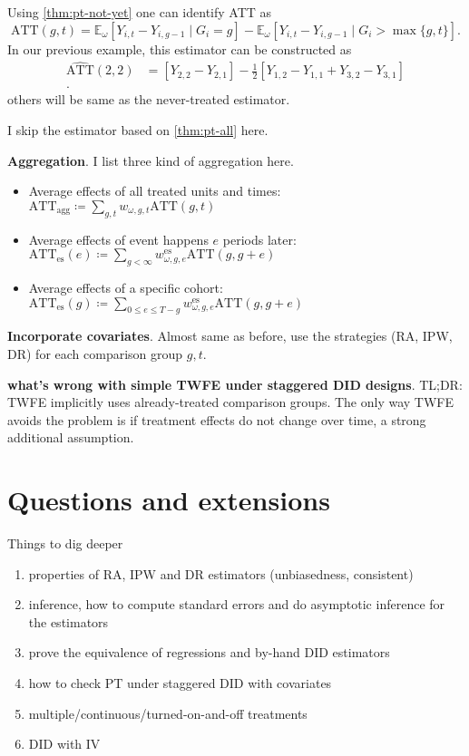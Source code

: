 \documentclass[12pt]{article}
\begin{document}
Using \autoref{thm:pt-not-yet} one can identify ATT as
\[
  \text{ATT}(g,t) = \mathbb{E}_{\omega}[Y_{i,t}-Y_{i,g-1} \mid G_i=g] -
  \mathbb{E}_{\omega}[Y_{i,t}-Y_{i,g-1} \mid G_i > \max \{g,t\} ]
.\]
In our previous example, this estimator can be constructed as
\begin{align*}
  \widehat{\text{ATT}}(2,2) &= [Y_{2,2}-Y_{2,1}] - \frac{1}{2} [Y_{1,2}-Y_{1,1} +
  Y_{3,2}-Y_{3,1}] \\
  .
\end{align*}
others will be same as the never-treated estimator.

I skip the estimator based on \autoref{thm:pt-all} here.


\textbf{Aggregation}. I list three kind of aggregation here.
\begin{itemize}
  \item Average effects of all treated units and times: \( \text{ATT}_{\text{agg}}
    \coloneqq \sum_{g,t} w_{\omega, g,t} \text{ATT}(g,t) \)
  \item Average effects of event happens \( e \) periods later: \(
      \text{ATT}_{\text{es}}(e) \coloneqq \sum_{g < \infty} w^{\text{es}}_{\omega, g, e}
    \text{ATT}(g,g+e)  \)
  \item Average effects of a specific cohort: \( \text{ATT}_{\text{es}}(g) \coloneqq
    \sum_{0 \le e \le T-g} w^{\text{es}}_{\omega, g, e} \text{ATT}(g,g+e)  \)
\end{itemize}

\textbf{Incorporate covariates}. Almost same as before, use the strategies (RA, IPW, DR)
for each comparison group \( g,t \).

\textbf{what's wrong with simple TWFE under staggered DID designs}. TL;DR: TWFE
implicitly uses already-treated comparison groups. The only
way TWFE avoids the problem is if treatment effects do not change over time, a strong additional
assumption.

\section{Questions and extensions}

Things to dig deeper

\begin{enumerate}
  \item properties of RA, IPW and DR estimators (unbiasedness, consistent)
  \item inference, how to compute standard errors and do asymptotic inference for the estimators
  \item prove the equivalence of regressions and by-hand DID estimators
  \item how to check PT under staggered DID with covariates
  \item multiple/continuous/turned-on-and-off treatments
  \item DID with IV
\end{enumerate}
\end{document}
